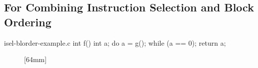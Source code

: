 \subsection{For Combining Instruction Selection and Block Ordering}

\begin{filecontents*}{isel-blorder-example.c}
int f() {
  int a;
  do {
    a = g();
  } while (a == 0);
  return a;
}
\end{filecontents*}

\begin{figure}
  \centering%
                {}%
  \hspace{5mm}%
                [64mm]%
                {}%

  \vspace{\betweensubfigures}


\end{figure}
